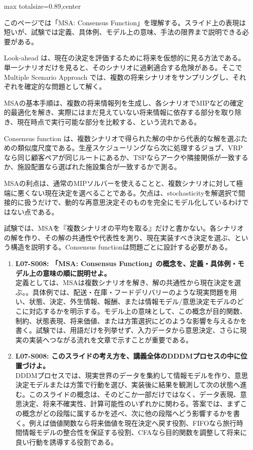 \begin{minipage}[t]{0.58\textwidth}
\begin{adjustbox}{max totalsize={\textwidth}{0.89\textheight},center}
\begin{minipage}{\textwidth}\scriptsize
{}このページでは「MSA: Consensus Function」を理解する。スライド上の表現は短いが、試験では定義、具体例、モデル上の意味、手法の限界まで説明できる必要がある。\par
Look-ahead は、現在の決定を評価するために将来を仮想的に見る方法である。単一シナリオだけを見ると、そのシナリオに過剰適合する危険がある。そこで Multiple Scenario Approach では、複数の将来シナリオをサンプリングし、それぞれを確定的な問題として解く。\par
MSAの基本手順は、複数の将来情報列を生成し、各シナリオでMIPなどの確定的最適化を解き、実際にはまだ見えていない将来情報に依存する部分を取り除き、現在時点で実行可能な部分を比較する、という流れである。\par
Consensus function は、複数シナリオで得られた解の中から代表的な解を選ぶための類似度尺度である。生産スケジューリングなら次に処理するジョブ、VRPなら同じ顧客ペアが同じルートにあるか、TSPならアークや隣接関係が一致するか、施設配置なら選ばれた施設集合が一致するかで測る。\par
MSAの利点は、通常のMIPソルバーを使えることと、複数シナリオに対して極端に悪くない現在決定を選べることである。欠点は、stochasticityを解選択で間接的に扱うだけで、動的な再意思決定そのものを完全にモデル化しているわけではない点である。\par
試験では、MSAを『複数シナリオの平均を取る』だけと書かない。各シナリオの解を作り、その解の共通性や代表性を測り、現在実装すべき決定を選ぶ、という構造を説明する。Consensus functionは問題ごとに設計する必要がある。\par{}\begin{enumerate}\item \textbf{L07-S008: 「MSA: Consensus Function」の概念を、定義・具体例・モデル上の意味の順に説明せよ。}\\定義としては、MSAは複数シナリオを解き、解の共通性から現在決定を選ぶ。。具体例では、配送・在庫・フードデリバリーのような現実問題を用い、状態、決定、外生情報、報酬、または情報モデル/意思決定モデルのどこに対応するかを明示する。モデル上の意味として、この概念が目的関数、制約、状態表現、将来価値、または方策選択にどのような影響を与えるかを書く。試験では、用語だけを列挙せず、入力データから意思決定、さらに現実の実装へつながる流れを文章で示すことが重要である。\item \textbf{L07-S008: このスライドの考え方を、講義全体のDDDMプロセスの中に位置づけよ。}\\DDDMプロセスでは、現実世界のデータを集約して情報モデルを作り、意思決定モデルまたは方策で行動を選び、実装後に結果を観測して次の状態へ進む。このスライドの概念は、そのどこか一部だけではなく、データ表現、意思決定、将来不確実性、計算可能性のいずれかに関わる。答案では、まずこの概念がどの段階に属するかを述べ、次に他の段階へどう影響するかを書く。例えば価値関数なら将来価値を現在決定へ戻す役割、FIFOなら旅行時間情報モデルの整合性を保証する役割、CFAなら目的関数を調整して将来に良い行動を誘導する役割である。\end{enumerate}

\end{minipage}
\end{adjustbox}
\end{minipage}
